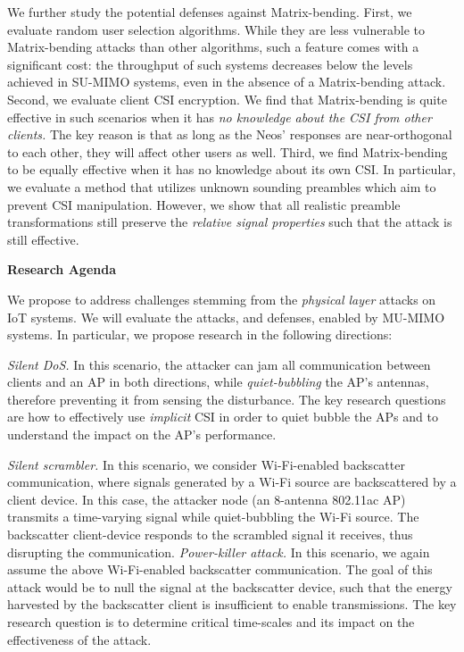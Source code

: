 We further study the potential defenses against Matrix-bending.  First, we evaluate random user selection algorithms. While they are less vulnerable to Matrix-bending attacks than other algorithms, such a feature comes with a significant cost: the throughput of such systems decreases below the levels achieved in SU-MIMO systems, even in the absence of a Matrix-bending attack. Second, we evaluate client CSI encryption. We find that Matrix-bending is quite effective in such scenarios when it has \emph{no knowledge about the CSI from other clients.} The key reason is that as long as the Neos' responses are near-orthogonal to each other, they will affect other users as well. Third, we find Matrix-bending to be equally effective when it has no knowledge about its own CSI. In particular, we evaluate a method that utilizes unknown sounding preambles which aim to prevent CSI manipulation. However, we show that all realistic preamble transformations still preserve the \emph{relative signal properties} such that the attack is still effective.

{\bf Research Agenda}

We propose to address challenges stemming from the \emph{physical layer} attacks on IoT systems. We will evaluate the attacks, and defenses, enabled by MU-MIMO systems. In particular, we propose research in the following directions:

\emph{Silent DoS.} In this scenario, the attacker can jam all communication between clients and an AP in both directions, while \emph{quiet-bubbling} the AP’s antennas, therefore preventing it from sensing the disturbance. The key research questions are how to effectively use \emph{implicit} CSI in order to quiet bubble the APs and to understand the impact on the AP’s performance.

\emph{Silent scrambler.} In this scenario, we consider Wi-Fi-enabled backscatter communication, where signals generated by a Wi-Fi source are backscattered by a client device. In this case, the attacker node (an 8-antenna 802.11ac AP) transmits a time-varying signal while quiet-bubbling the Wi-Fi source. The backscatter client-device responds to the scrambled signal it receives, thus disrupting the communication.
\emph{Power-killer attack.} In this scenario, we again assume the above Wi-Fi-enabled backscatter communication. The goal of this attack would be to null the signal at the backscatter device, such that the energy harvested by the backscatter client is insufficient to enable transmissions. The key research question is to determine critical time-scales and its impact on the effectiveness of the attack.

